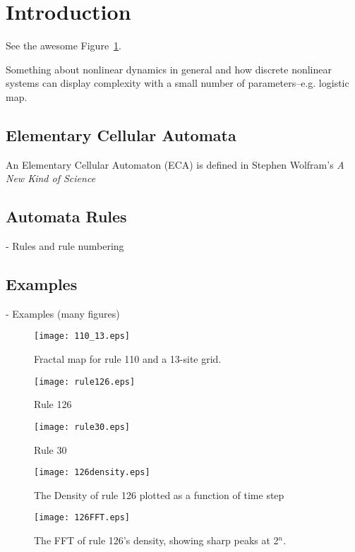 \section{Introduction}

See the awesome Figure~\ref{110_map}.

Something about nonlinear dynamics in general and how discrete
nonlinear systems can display complexity with a small number of
parameters--e.g. logistic map.

\subsection{Elementary Cellular Automata}

An Elementary Cellular Automaton (ECA) is defined in Stephen Wolfram's
\emph{A New Kind of Science}~\cite{anks}

\subsection{Automata Rules}
- Rules and rule numbering

\subsection{Examples}
- Examples (many figures)

\begin{figure}
    \centering
    \texttt{[image: 110\_13.eps]}
    \caption{\label{110_map} Fractal map for rule 110 and a 13-site grid.}
\end{figure}

\begin{figure}
    \begin{minipage}[b]{0.49\textwidth}
        \centering
        \texttt{[image: rule126.eps]}
        \caption{\label{rule126} Rule 126}
    \end{minipage}
    \hspace{0.5cm}
    \begin{minipage}[b]{0.49\textwidth}
        \centering
        \texttt{[image: rule30.eps]}
        \caption{\label{rule30} Rule 30}
    \end{minipage}
\end{figure}


\begin{figure}
    \begin{minipage}[b]{0.49\textwidth}
        \centering
        \texttt{[image: 126density.eps]}
        \caption{\label{126density} The Density of rule 126 plotted as a function of time step}
    \end{minipage}
    \hspace{0.5cm}
    \begin{minipage}[b]{0.49\textwidth}
        \centering
        \texttt{[image: 126FFT.eps]}
        \caption{\label{126FFT} The FFT of rule 126's density, showing sharp peaks at 2$^n$.}
    \end{minipage}
\end{figure}


